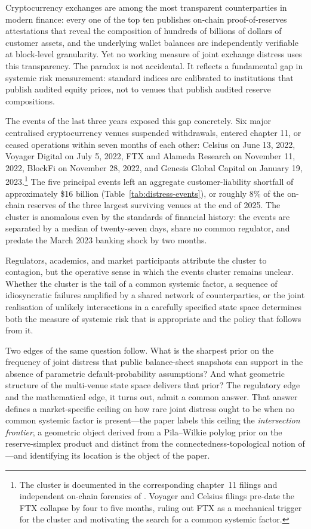 \documentclass[12pt]{article}
\theoremstyle{sampledef}
\theoremstyle{sampleplain}
\theoremstyle{sampleremark}
\newcommand{\1}{\mathbf{1}}
\begin{document}
Cryptocurrency exchanges are among the most transparent
counterparties in modern finance: every one of the top ten publishes
on-chain proof-of-reserves attestations that reveal the composition
of hundreds of billions of dollars of customer assets, and the
underlying wallet balances are independently verifiable at
block-level granularity. Yet no working measure of joint exchange
distress uses this transparency. The paradox is not accidental. It
reflects a fundamental gap in systemic risk measurement: standard
indices are calibrated to institutions that publish audited equity
prices, not to venues that publish audited reserve compositions.

The events of the last three years exposed this gap concretely.
Six major centralised cryptocurrency venues suspended withdrawals,
entered chapter 11, or ceased operations within seven months of
each other: Celsius on June 13, 2022, Voyager Digital on July 5,
2022, FTX and Alameda Research on November 11, 2022, BlockFi on
November 28, 2022, and Genesis Global Capital on January 19,
2023.\footnote{The cluster is documented in the corresponding
chapter~11 filings and independent on-chain forensics of
\citet{Griffin-Kruger-Mei2023}. Voyager and Celsius filings
pre-date the FTX collapse by four to five months, ruling out FTX
as a mechanical trigger for the cluster and motivating the search
for a common systemic factor.} The five principal events left an
aggregate customer-liability shortfall of approximately \$16 billion
(Table~\ref{tab:distress-events}), or roughly $8\%$ of the on-chain
reserves of the three largest surviving venues at the end of 2025.
The cluster is anomalous even by the standards of financial history:
the events are separated by a median of twenty-seven days, share no
common regulator, and predate the March 2023 banking shock by two
months.

Regulators, academics, and market participants attribute the
cluster to contagion, but the operative sense in which the events
cluster remains unclear. Whether the cluster is the tail of a
common systemic factor, a sequence of idiosyncratic failures
amplified by a shared network of counterparties, or the joint
realisation of unlikely intersections in a carefully specified
state space determines both the measure of systemic risk that is
appropriate and the policy that follows from it.

Two edges of the same question follow. What is the sharpest prior on
the frequency of joint distress that public balance-sheet snapshots
can support in the absence of parametric default-probability
assumptions? And what geometric structure of the multi-venue state
space delivers that prior? The regulatory edge and the mathematical
edge, it turns out, admit a common answer. That answer defines a
market-specific ceiling on how rare joint distress ought to be when
no common systemic factor is present---the paper labels this ceiling
the \emph{intersection frontier}, a geometric object derived from a
Pila--Wilkie polylog prior on the reserve-simplex product and distinct
from the connectedness-topological notion of
\citet{DieboldYilmaz2014}---and identifying its location is the
object of the paper.
\end{document}
